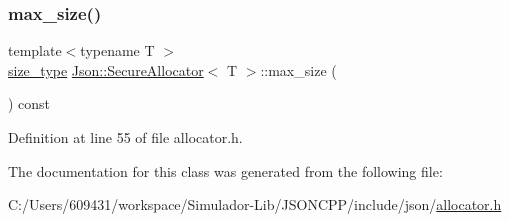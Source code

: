 \hypertarget{class_json_1_1_secure_allocator_a1ca352414d0ce358c0dca70fb26c674c}{}\label{class_json_1_1_secure_allocator_a1ca352414d0ce358c0dca70fb26c674c} 
\subsubsection{\texorpdfstring{max\+\_\+size()}{max\_size()}}
{\footnotesize\ttfamily template$<$typename T $>$ \\
\hyperlink{class_json_1_1_secure_allocator_a61c258f0ae80af6982fae200b55a4dc9}{size\+\_\+type} \hyperlink{class_json_1_1_secure_allocator}{Json\+::\+Secure\+Allocator}$<$ T $>$\+::max\+\_\+size (\begin{DoxyParamCaption}{ }\end{DoxyParamCaption}) const\hspace{0.3cm}{\ttfamily [inline]}}



Definition at line 55 of file allocator.\+h.



The documentation for this class was generated from the following file\+:\begin{DoxyCompactItemize}
\item 
C\+:/\+Users/609431/workspace/\+Simulador-\/\+Lib/\+J\+S\+O\+N\+C\+P\+P/include/json/\hyperlink{allocator_8h}{allocator.\+h}\end{DoxyCompactItemize}
